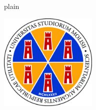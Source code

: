 \documentclass[
11pt, %
oneside, %
english, %
onehalfspacing,%
headsepline, %
]{BachelorThesis} %
\author{Angelo \textsc{Trotta}} %
\begin{document}
	\renewenvironment{abstract} 
	
	\frontmatter %
	
	\pagestyle{plain} %
	
	
	\begin{titlepage}
		\begin{center}
			
			\includegraphics[width=0.35\textwidth]{figs/logo} %
			
			\vspace{0.75cm}

			{\scshape\huge \univname\par}\vspace{0.15cm} %
			
			{\scshape\Large \deptname\par}\vspace{1cm} %
			
			\\[0.05cm]
			
			\textsc{\Large \degreename}\\[1cm]
			
			\\[0.05cm]
			
			\textsc{\Large \subjectname}\\[1cm] %
			
			{\huge \bfseries \ttitle\par}\vspace{1.5cm} %
			

\end{center}
\end{titlepage}
\end{document}
